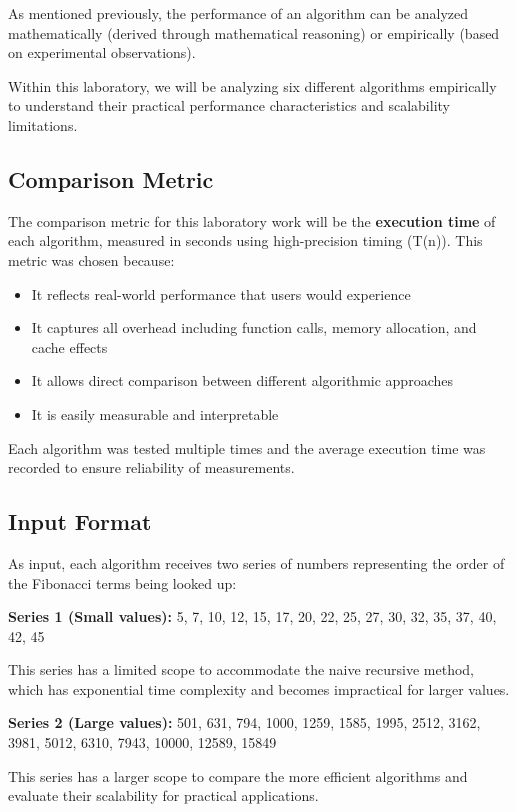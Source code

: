 \documentclass[12pt]{article}
\begin{document}
As mentioned previously, the performance of an algorithm can be analyzed mathematically
(derived through mathematical reasoning) or empirically (based on experimental observations).

Within this laboratory, we will be analyzing six different algorithms empirically to understand their practical performance characteristics and scalability limitations.

\subsection{Comparison Metric}
\hspace{0.8cm} The comparison metric for this laboratory work will be the \textbf{execution time} of each
algorithm, measured in seconds using high-precision timing (T(n)). This metric was chosen because:

\begin{itemize}
    \item It reflects real-world performance that users would experience
    \item It captures all overhead including function calls, memory allocation, and cache effects
    \item It allows direct comparison between different algorithmic approaches
    \item It is easily measurable and interpretable
\end{itemize}

Each algorithm was tested multiple times and the average execution time was recorded to ensure reliability of measurements.

\subsection{Input Format}
\hspace{0.8cm} As input, each algorithm receives two series of numbers representing the order of the
Fibonacci terms being looked up:

\textbf{Series 1 (Small values):} 5, 7, 10, 12, 15, 17, 20, 22, 25, 27, 30, 32, 35, 37, 40, 42, 45

This series has a limited scope to accommodate the naive recursive method, which has exponential time complexity and becomes impractical for larger values.

\textbf{Series 2 (Large values):} 501, 631, 794, 1000, 1259, 1585, 1995, 2512, 3162, 3981, 5012, 6310, 7943, 10000, 12589, 15849

This series has a larger scope to compare the more efficient algorithms and evaluate their scalability for practical applications.
\end{document}
